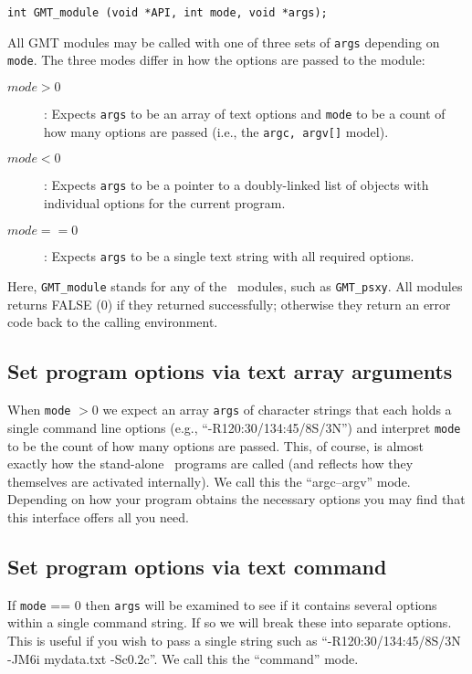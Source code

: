 \documentclass[11pt]{report}
\begin{document}
\begin{verbatim}
int GMT_module (void *API, int mode, void *args);
\end{verbatim}
All GMT modules may be called with one of three sets of \texttt{args} depending on \texttt{mode}.
The three modes differ in how the options are passed to the module:
\begin{description}
\item [$mode > 0$]: Expects \texttt{args} to be an array of text options and \texttt{mode} to be a count of
how many options are passed (i.e., the \texttt{argc, argv[]} model).
\item [$mode < 0$]: Expects \texttt{args} to be a pointer to a doubly-linked list of objects with individual options
for the current program.
\item [$mode == 0$]: Expects \texttt{args} to be a single text string with all required options.
\end{description}
Here, \texttt{GMT\_module} stands for any of the \GMT\ modules, such as \texttt{GMT\_psxy}.
All modules returns FALSE (0) if they returned successfully; otherwise they return an error code
back to the calling environment.

\subsection{Set program options via text array arguments}

When \texttt{mode} $> 0$ we expect an array \texttt{args} of character strings that each
holds a single command line options (e.g., ``-R120:30/134:45/8S/3N'') and interpret \texttt{mode}
to be the count of how many options are passed.  This, of course, is almost exactly how the stand-alone \GMT\
programs are called (and reflects how they themselves are activated internally).  We call this the ``argc--argv'' mode.
Depending on how your program obtains the necessary options you may find that this interface offers all you need.

\subsection{Set program options via text command}

If \texttt{mode} == 0 then \texttt{args} will be examined to see if it contains several options within a single command string.
If so we will break these into separate options.  This is useful if you wish to pass a single string such as
``-R120:30/134:45/8S/3N -JM6i mydata.txt -Sc0.2c''.  We call this the ``command'' mode.
\end{document}
